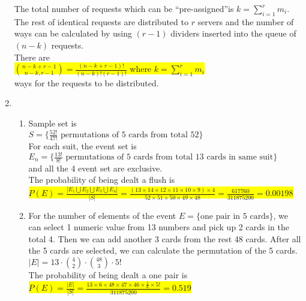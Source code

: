 \documentclass{article}
\begin{document}
\begin{enumerate}
		\mysolu
		The total number of requests which can be \textquotedblleft pre-assigned\textquotedblright is ${k = \sum\limits_{i=1}^r m_i}$. The rest of identical requests are distributed to ${r}$ servers and the number of ways can be calculated by using ${(r-1)}$ dividers inserted into the queue of ${(n-k)}$ requests.\\
		\myansw
		There are\\
		\colorbox{yellow}{
			${{n-k+r-1 \choose n-k,r-1}=\frac{(n-k+r-1)!}{(n-k)!(r-1)!}}$ where ${k = \sum\limits_{i=1}^r m_i}$
		}\\
		ways for the requests to be distributed.\\



	\item
	\begin{enumerate}
		\item
		\mysolu
		Sample set is\\
		${S=\{{\frac{52!}{47!}}\text{ permutations of 5 cards from total 52}\}}$\\
		
		For each suit, the event set is\\
		${E_n=\{{\frac{13!}{8!}}\text{ permutations of 5 cards from total 13 cards in same suit}\}}$\\
		and all the 4 event set are exclusive.\\
		\myansw
		The probability of being dealt a flush is\\
		\colorbox{yellow}{
			${
				P(E)=\frac{|E_1\bigcup E_2\bigcup E_3\bigcup E_4|}{|S|} = \frac{(13\times14\times12\times11\times10\times9)\times4}{52\times51\times50\times49\times48}=\frac{617760}{311875200}=0.00198
			}$
		}\\
		
		\item
		\mysolu
		For the number of elements of the event ${E=\{\text{one pair in 5 cards}\}}$, we can select 1 numeric value from 13 numbers and pick up 2 cards in the total 4. Then we can add another 3 cards from the rest 48 cards. After all the 5 cards are selected, we can calculate the permutation of the 5 cards.\\
		${|E|=13\cdot{4 \choose 2}\cdot{48 \choose 3} \cdot 5!}$\\
		\myansw
		The probability of being dealt a one pair is\\
		\colorbox{yellow}{
			${P(E)=\frac{|E|}{|S|}=\frac{13\times6\times48\times47\times46\times \frac{1}{6} \times 5!}{311875200}=0.519}$
		}\\
	

\end{enumerate}
\end{enumerate}
\end{document}
